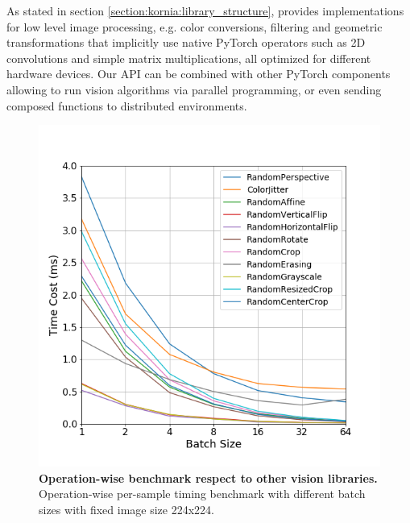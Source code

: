 As stated in section \ref{section:kornia:library_structure}, \lib{} provides implementations for low level image processing, e.g. color conversions, filtering and geometric   transformations that implicitly use native PyTorch operators such as 2D convolutions and simple matrix multiplications,  all  optimized for different hardware devices. Our API can be combined with other PyTorch components allowing to run vision algorithms via parallel programming, or even sending composed functions to distributed environments.

\begin{figure}
\centering
 \includegraphics[width=0.75\linewidth]{main/chapter03/data/op_benchmark.png}
\caption[Operation-wise benchmark respect to other vision libraries]{{\bf Operation-wise benchmark respect to other vision libraries.} Operation-wise per-sample timing benchmark with different batch sizes with fixed image size 224x224.}
\label{fig:opwise_benchmark}
\end{figure}

